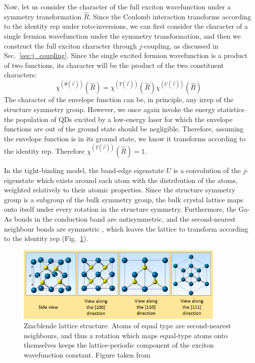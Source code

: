 Now, let us consider the character of the full exciton wavefunction under a symmetry transformation $\hat{R}$. Since the Coulomb interaction transforms according to the identity rep under roto-inversions, we can first consider the character of a single fermion wavefunction under the symmetry transformation, and then we construct the full exciton character through $j$-coupling, as discussed in Sec.~\ref{sec:j_coupling}. Since the single excited fermion wavefunction is a product of two functions, its character will be the product of the two constituent characters:
\begin{equation} \label{eq:character_breakdown}
\chi^{\left(\Psi\left(\vec{r}\right)\right)}\left(\hat{R}\right)=\chi^{\left(\Upsilon\left(\vec{r}\right)\right)}\left(\hat{R}\right)\chi^{\left(U\left(\vec{r}\right)\right)}\left(\hat{R}\right)
\end{equation}
The character of the envelope function can be, in principle, any irrep of the structure symmetry group. However, we once again invoke the energy statistics--the population of QDs excited by a low-energy laser for which the envelope functions are out of the ground state should be negligible. Therefore, assuming the envelope function is in its ground state, we know it transforms according to the identity rep. Therefore $\chi^{\left(\Upsilon\left(\vec{r}\right)\right)}\left(\hat{R}\right)=1$.

In the tight-binding model, the band-edge eigenstate $U$ is a convolution of the $j$-eigenstate which exists around each atom with the distribution of the atoms, weighted relatively to their atomic properties. Since the structure symmetry group is a subgroup of the bulk symmetry group, the bulk crystal lattice maps onto itself under every rotation in the structure symmetry. Furthermore, the Ga-As bonds in the conduction band are antisymmetric, and the second-nearest neighbour bonds are symmetric \cite{gaas_bonding}, which leaves the lattice to transform according to the identity rep (Fig.~\ref{fig:zincblende_lattice_structure}).

\begin{figure}
\begin{center}
\includegraphics[width=0.9\textwidth]{figures/zincblende_lattice_structure}
\caption{Zincblende lattice structure. Atoms of equal type are second-nearest neighbours, and thus a rotation which maps equal-type atoms onto themselves keeps the lattice-periodic component of the exciton wavefunction constant. Figure taken from \cite[Fig.~2.3]{zincblende_lattice_structure} \label{fig:zincblende_lattice_structure}}
\end{center}
\end{figure}

